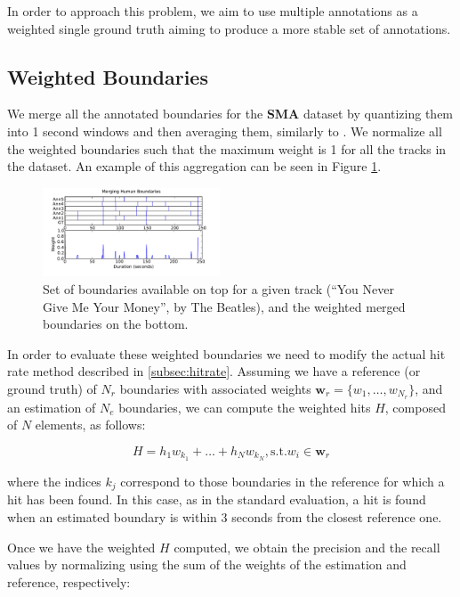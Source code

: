 \documentclass{article}
\begin{document}
In order to approach this problem, we aim to use multiple annotations as a weighted single ground truth aiming to produce a more stable set of annotations.

\subsection{Weighted Boundaries}

We merge all the annotated boundaries for the \textbf{SMA} dataset by quantizing them into 1 second windows and then averaging them, similarly to \cite{Thom2002}.
We normalize all the weighted boundaries such that the maximum weight is 1 for all the tracks in the dataset.
An example of this aggregation can be seen in Figure \ref{fig:merging-bounds}.

\begin{figure}
  \centering
  \includegraphics[width=0.47\textwidth]{plots/merging-bounds.pdf}
  \caption{Set of boundaries available on top for a given track (``You Never Give Me Your Money'', by The Beatles), and the weighted merged boundaries on the bottom.}
  \label{fig:merging-bounds}
\end{figure}

In order to evaluate these weighted boundaries we need to modify the actual hit rate method described in \ref{subsec:hitrate}.
Assuming we have a reference (or ground truth) of $N_r$ boundaries with associated weights $\textbf{w}_r = \{w_1, \ldots, w_{N_r}\}$, and an estimation of $N_e$ boundaries, we can compute the weighted hits $H$, composed of $N$ elements, as follows:

\begin{equation}
  H = h_1 w_{k_1} + \ldots + h_N w_{k_N}, \mbox{s.t.} w_i \in \textbf{w}_r
\end{equation}

where the indices $k_j$ correspond to those boundaries in the reference for which a hit has been found.
In this case, as in the standard evaluation, a hit is found when an estimated boundary is within 3 seconds from the closest reference one.

Once we have the weighted $H$ computed, we obtain the precision and the recall values by normalizing using the sum of the weights of the estimation and reference, respectively:
\end{document}
